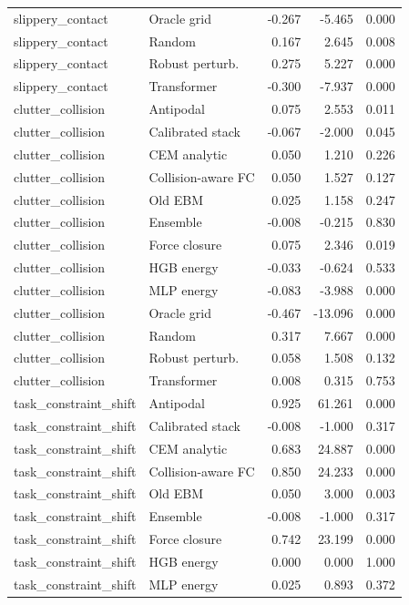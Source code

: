 {\begin{longtable}{llrrr}
slippery\_contact & Oracle grid & -0.267 & -5.465 & 0.000 \\
slippery\_contact & Random & 0.167 & 2.645 & 0.008 \\
slippery\_contact & Robust perturb. & 0.275 & 5.227 & 0.000 \\
slippery\_contact & Transformer & -0.300 & -7.937 & 0.000 \\
clutter\_collision & Antipodal & 0.075 & 2.553 & 0.011 \\
clutter\_collision & Calibrated stack & -0.067 & -2.000 & 0.045 \\
clutter\_collision & CEM analytic & 0.050 & 1.210 & 0.226 \\
clutter\_collision & Collision-aware FC & 0.050 & 1.527 & 0.127 \\
clutter\_collision & Old EBM & 0.025 & 1.158 & 0.247 \\
clutter\_collision & Ensemble & -0.008 & -0.215 & 0.830 \\
clutter\_collision & Force closure & 0.075 & 2.346 & 0.019 \\
clutter\_collision & HGB energy & -0.033 & -0.624 & 0.533 \\
clutter\_collision & MLP energy & -0.083 & -3.988 & 0.000 \\
clutter\_collision & Oracle grid & -0.467 & -13.096 & 0.000 \\
clutter\_collision & Random & 0.317 & 7.667 & 0.000 \\
clutter\_collision & Robust perturb. & 0.058 & 1.508 & 0.132 \\
clutter\_collision & Transformer & 0.008 & 0.315 & 0.753 \\
task\_constraint\_shift & Antipodal & 0.925 & 61.261 & 0.000 \\
task\_constraint\_shift & Calibrated stack & -0.008 & -1.000 & 0.317 \\
task\_constraint\_shift & CEM analytic & 0.683 & 24.887 & 0.000 \\
task\_constraint\_shift & Collision-aware FC & 0.850 & 24.233 & 0.000 \\
task\_constraint\_shift & Old EBM & 0.050 & 3.000 & 0.003 \\
task\_constraint\_shift & Ensemble & -0.008 & -1.000 & 0.317 \\
task\_constraint\_shift & Force closure & 0.742 & 23.199 & 0.000 \\
task\_constraint\_shift & HGB energy & 0.000 & 0.000 & 1.000 \\
task\_constraint\_shift & MLP energy & 0.025 & 0.893 & 0.372 \\

\end{longtable}}
